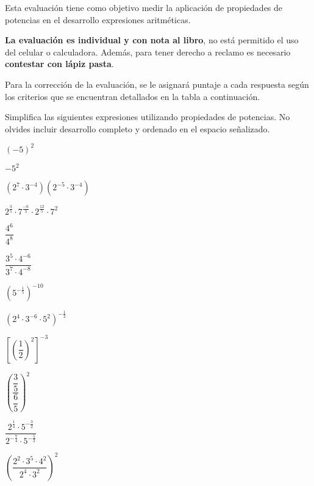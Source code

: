 \documentclass{caes}
\begin{document}
\datos
{}

Esta evaluación tiene como objetivo medir la aplicación de propiedades de 
potencias en el desarrollo expresiones aritméticas.  

{\bfseries La evaluación es individual y con nota al libro}, no está permitido 
el uso del celular o calculadora. Además, para tener derecho a 
reclamo es necesario {\bfseries contestar con lápiz pasta}.


Para la corrección de la evaluación, se le asignará puntaje a cada respuesta 
según los criterios que se encuentran detallados en la tabla a continuación.

\pauta

\parte Simplifica las siguientes expresiones utilizando propiedades de potencias. 
No olvides incluir desarrollo completo y ordenado en el espacio señalizado.


\begin{multicols}{2}
    \pregunta $(-5)^2$
    \desarrollo[15mm]

    \pregunta $-5^2$
    \desarrollo[15mm]
\end{multicols}
\begin{multicols}{2}\setlength{\parindent}{0pt}
    \pregunta $(2^7 \cdot 3^{-4})(2^{-5} \cdot 3^{-4})$
    \desarrollo[30mm]

    \pregunta $2^{\frac{3}{5}}\cdot 7^{\frac{-6}{3}} \cdot 2^{\frac{12}{5}} \cdot 7^2$
    \desarrollo[30mm]
\end{multicols}

\begin{multicols}{2}
    \pregunta $\dfrac{4^6}{4^8}$
    \desarrollo[30mm]

    \pregunta $\dfrac{3^5\cdot 4^{-6}}{3^7 \cdot 4^{-8}}$
    \desarrollo[30mm]
\end{multicols}
\begin{multicols}{2}
    \pregunta $\left(5^{-\frac{1}{5}}\right)^{-10}$
    \desarrollo[30mm]

    \pregunta $\left(2^4\cdot 3^{-6} \cdot 5^2\right)^{-\frac{1}{2}}$
    \desarrollo[30mm]
\end{multicols}
\begin{multicols}{2}
    \pregunta $\left[\left(\dfrac{1}{2}\right)^{2}\right]^{-3}$
    \desarrollo[40mm]

    \pregunta $\left(\dfrac{\dfrac{3}{5}}{\dfrac{6}{5}}\right)^2$
    \desarrollo[40mm]
\end{multicols}
\begin{multicols}{2}
    \pregunta $\dfrac{2^{\frac{1}{4}}\cdot 5^{-\frac{3}{2}}}{2^{-\frac{7}{4}}\cdot 5^{-\frac{5}{2}}}$
    \desarrollo[50mm]

    \pregunta $\left(\dfrac{2^2\cdot 3^5 \cdot 4^2}{2^4 \cdot 3^2}\right)^2$
    \desarrollo[50mm]
\end{multicols}
\end{document}
